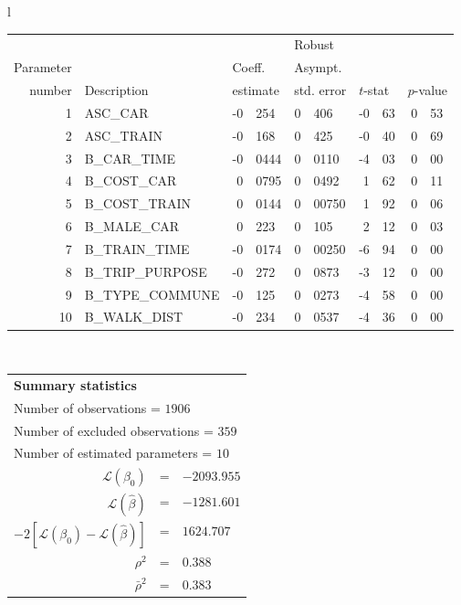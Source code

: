   \begin{tabular}{l}
\begin{tabular}{rlr@{.}lr@{.}lr@{.}lr@{.}l}
         &                       &   \multicolumn{2}{l}{}    & \multicolumn{2}{l}{Robust}  &     \multicolumn{4}{l}{}   \\
Parameter &                       &   \multicolumn{2}{l}{Coeff.}      & \multicolumn{2}{l}{Asympt.}  &     \multicolumn{4}{l}{}   \\
number &  Description                     &   \multicolumn{2}{l}{estimate}      & \multicolumn{2}{l}{std. error}  &   \multicolumn{2}{l}{$t$-stat}  &   \multicolumn{2}{l}{$p$-value}   \\

\hline

1 & ASC_CAR & -0&254 & 0&406 & -0&63 & 0&53\\
2 & ASC_TRAIN & -0&168 & 0&425 & -0&40 & 0&69\\
3 & B_CAR_TIME & -0&0444 & 0&0110 & -4&03 & 0&00\\
4 & B_COST_CAR & 0&0795 & 0&0492 & 1&62 & 0&11\\
5 & B_COST_TRAIN & 0&0144 & 0&00750 & 1&92 & 0&06\\
6 & B_MALE_CAR & 0&223 & 0&105 & 2&12 & 0&03\\
7 & B_TRAIN_TIME & -0&0174 & 0&00250 & -6&94 & 0&00\\
8 & B_TRIP_PURPOSE & -0&272 & 0&0873 & -3&12 & 0&00\\
9 & B_TYPE_COMMUNE & -0&125 & 0&0273 & -4&58 & 0&00\\
10 & B_WALK_DIST & -0&234 & 0&0537 & -4&36 & 0&00\\
\hline
\end{tabular}
\\
\begin{tabular}{rcl}
\multicolumn{3}{l}{\bf Summary statistics}\\
\multicolumn{3}{l}{ Number of observations = $1906$} \\
\multicolumn{3}{l}{ Number of excluded observations = $359$} \\
\multicolumn{3}{l}{ Number of estimated  parameters = $10$} \\
 $\mathcal{L}(\beta_0)$ &=&  $-2093.955$ \\
 $\mathcal{L}(\hat{\beta})$ &=& $-1281.601 $  \\
 $-2[\mathcal{L}(\beta_0) -\mathcal{L}(\hat{\beta})]$ &=& $1624.707$ \\
    $\rho^2$ &=&   $0.388$ \\
    $\bar{\rho}^2$ &=&    $0.383$ \\
\end{tabular}
  \end{tabular}
